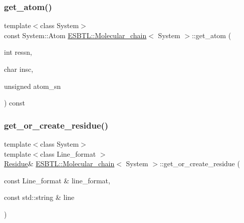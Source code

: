 \mbox{\label{classESBTL_1_1Molecular__chain_a79ec125306145c87a869a1d966700c75}} 
\subsubsection{\texorpdfstring{get\+\_\+atom()}{get\_atom()}}
{\footnotesize\ttfamily template$<$class System$>$ \\
const System\+::\+Atom \hyperlink{classESBTL_1_1Molecular__chain}{E\+S\+B\+T\+L\+::\+Molecular\+\_\+chain}$<$ System $>$\+::get\+\_\+atom (\begin{DoxyParamCaption}\item[{int}]{ressn,  }\item[{char}]{insc,  }\item[{unsigned}]{atom\+\_\+sn }\end{DoxyParamCaption}) const\hspace{0.3cm}{\ttfamily [inline]}}

\mbox{\label{classESBTL_1_1Molecular__chain_a4b4f28e5fde3c5b42f1bb236f21c6c5d}} 
\subsubsection{\texorpdfstring{get\+\_\+or\+\_\+create\+\_\+residue()}{get\_or\_create\_residue()}\hspace{0.1cm}{\footnotesize\ttfamily [1/2]}}
{\footnotesize\ttfamily template$<$class System$>$ \\
template$<$class Line\+\_\+format $>$ \\
\hyperlink{classESBTL_1_1Molecular__chain_a59b61e0ecde5fb4c3d1765a37c9cf6cb}{Residue}\& \hyperlink{classESBTL_1_1Molecular__chain}{E\+S\+B\+T\+L\+::\+Molecular\+\_\+chain}$<$ System $>$\+::get\+\_\+or\+\_\+create\+\_\+residue (\begin{DoxyParamCaption}\item[{const Line\+\_\+format \&}]{line\+\_\+format,  }\item[{const std\+::string \&}]{line }\end{DoxyParamCaption})\hspace{0.3cm}{\ttfamily [inline]}}

